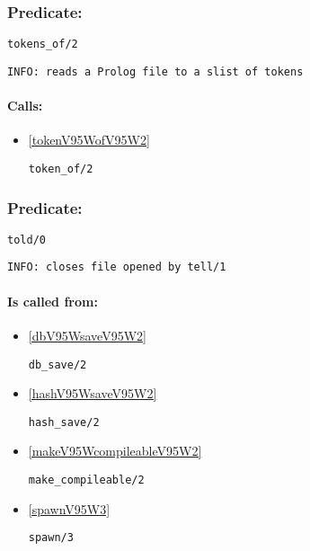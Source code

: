 \subsubsection{Predicate:} \label{tokensV95WofV95W2}

\begin{verbatim}
tokens_of/2
\end{verbatim}

{\small \begin{verbatim}
INFO: reads a Prolog file to a slist of tokens

\end{verbatim}}
\paragraph{Calls:} 
\begin{itemize}
\item \ref{tokenV95WofV95W2} 
\begin{verbatim}
token_of/2
\end{verbatim}

\end{itemize}

\subsubsection{Predicate:} \label{toldV95W0}

\begin{verbatim}
told/0
\end{verbatim}

{\small \begin{verbatim}
INFO: closes file opened by tell/1

\end{verbatim}}
\paragraph{Is called from:} 
\begin{itemize}
\item \ref{dbV95WsaveV95W2} 
\begin{verbatim}
db_save/2
\end{verbatim}

\item \ref{hashV95WsaveV95W2} 
\begin{verbatim}
hash_save/2
\end{verbatim}

\item \ref{makeV95WcompileableV95W2} 
\begin{verbatim}
make_compileable/2
\end{verbatim}

\item \ref{spawnV95W3} 
\begin{verbatim}
spawn/3
\end{verbatim}

\end{itemize}

